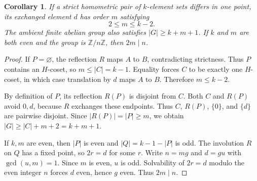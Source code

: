 \documentclass[11pt]{article}
\newtheorem{corollary}[theorem]{Corollary}
\newcommand{\Z}{\mathbb Z}
\begin{document}
\begin{corollary}\label{cor:torsion}
If a strict homometric pair of $k$-element sets differs in one point, its exchanged element $d$ has order $m$ satisfying
\[
 2\le m\le k-2.
\]
The ambient finite abelian group also satisfies $|G|\ge k+m+1$. If $k$ and $m$ are both even and the group is $\Z/n\Z$, then $2m\mid n$.
\end{corollary}
\begin{proof}
If $P=\varnothing$, the reflection $R$ maps $A$ to $B$, contradicting strictness. Thus $P$ contains an $H$-coset, so $m\le|C|=k-1$. Equality forces $C$ to be exactly one $H$-coset, in which case translation by $d$ maps $A$ to $B$. Therefore $m\le k-2$.

By definition of $P$, its reflection $R(P)$ is disjoint from $C$. Both $C$ and $R(P)$ avoid $0,d$, because $R$ exchanges these endpoints. Thus $C$, $R(P)$, $\{0\}$, and $\{d\}$ are pairwise disjoint. Since $|R(P)|=|P|\ge m$, we obtain $|G|\ge |C|+m+2=k+m+1$.

If $k,m$ are even, then $|P|$ is even and $|Q|=k-1-|P|$ is odd. The involution $R$ on $Q$ has a fixed point, so $2r=d$ for some $r$. Write $n=mg$ and $d=gu$ with $\gcd(u,m)=1$. Since $m$ is even, $u$ is odd. Solvability of $2r=d$ modulo the even integer $n$ forces $d$ even, hence $g$ even. Thus $2m\mid n$.
\end{proof}
\end{document}
